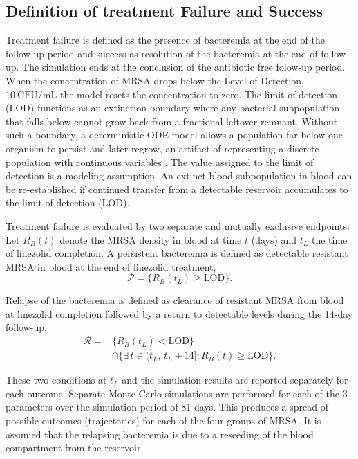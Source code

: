 \documentclass[journal]{IEEEtran}
\begin{document}
\subsection{Definition of treatment Failure and Success}

Treatment failure is defined as the presence of bacteremia at the end of the follow-up period and success as resolution of the bacteremia at the end of follow-up.  The simulation ends at the conclusion of the antibiotic free folow-up period.  When the concentration of MRSA drops below the Level of Detection, $10~\mathrm{CFU/mL}$ the model resets the concentration to zero.  The limit of detection (LOD) functions as an extinction boundary where any bacterial subpopulation that falls below cannot grow back from a fractional leftover remnant. Without such a boundary, a deterministic ODE model allows a population far below one organism to persist and later regrow, an artifact of representing a discrete population with continuous variables \cite{Mollison1991,CampilloLobry2012}. The value assigned to the limit of detection is a modeling assumption.  An extinct blood subpopulation in blood can be re-established if continued transfer from a detectable reservoir accumulates to the limit of detection (LOD).

Treatment failure is evaluated by two separate and mutually exclusive endpoints.
Let $R_B(t)$ denote the MRSA density in blood at time $t$ (days) and $t_L$ the time of linezolid completion.
A persistent bacteremia is defined as detectable resistant MRSA in blood at
the end of linezolid treatment,
\begin{equation}
    \mathcal{P} = \Big\{ R_B(t_L) \ge \mathrm{LOD} \Big\}.
    \label{eq:persistence}
\end{equation}

Relapse of the bacteremia is defined as clearance of resistant MRSA from
blood at linezolid completion followed by a return to detectable levels
during the 14-day follow-up,
\begin{equation}
\begin{aligned}
    \mathcal{R} = {}& \Big\{ R_B(t_L) < \mathrm{LOD} \Big\} \\
    &\cap \Big\{ \exists\, t \in (t_L,\, t_L + 14] : R_B(t) \ge \mathrm{LOD} \Big\}.
\end{aligned}
    \label{eq:relapse}
\end{equation}

These two conditions at $t_L$ and the simulation results are reported separately for each outcome.
Separate Monte Carlo simulations are performed for each of the 3 parameters over the simulation period of 81 days.
This produces a spread of possible outcomes (trajectories) for each of the four groups of MRSA.
It is assumed that the relapsing bacteremia is due to a reseeding of the blood compartment from the reservoir.
\end{document}

